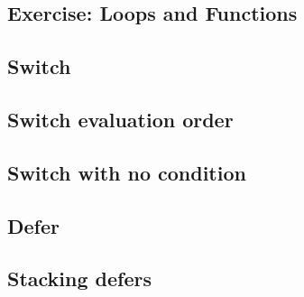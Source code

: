 \subsection{Exercise: Loops and Functions}


% 

\subsection{Switch}




\subsection{Switch evaluation order}




\subsection{Switch with no condition}




\subsection{Defer}




\subsection{Stacking defers}





